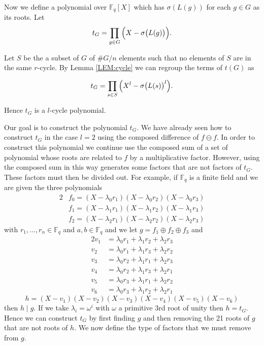 \documentclass{article}
\theoremstyle{plain}
\theoremstyle{definition}
\def\Fq {{ \mathbb{F} _ {q} }}
\begin{document}
    Now we define a polynomial over $\Fq[X]$ which has $\sigma(L(g))$ for each $g \in G$ as its roots. Let 
		\[
		    t_G = \prod_{g \in G}{\Bigl(X-\sigma \bigl(L(g) \bigr) \Bigr)}.
		\]
		
		Let $S$ be the a subset of $G$ of $ \#G/n$ elements such that no elements of $S$ are in the same $r$-cycle. By Lemma \ref{LEM:cycle} we can regroup the terms of $t(G)$ as

    \begin{equation}
		\label{EQ:tG}
        t_G=\prod_{s \in S}{\Bigl(X^l-\sigma \bigl(L(s) \bigr)^l \Bigr)}.
    \end{equation}

    Hence $t_G$ is a $l$-cycle polynomial.
		
	  Our goal is to construct the polynomial $t_G$. We have already seen how to construct $t_G$ in the case $l=2$ using the composed difference of $f \ominus f$. In order to construct this polynomial we continue use the composed sum of a set of polynomial whose roots are related to $f$ by a multiplicative factor. However, using the composed sum in this way generates some factors that are not factors of $t_G$. These factors must then be divided out. For example, if $\Fq$ is a finite field and we are given the three polynomials 
		\begin{alignat*}{2}
		    &f_0=(X-\lambda_0 r_1)(X-\lambda_0 r_2)(X-\lambda_0 r_3) \\
				&f_1=(X-\lambda_1 r_1)(X-\lambda_1 r_2)(X-\lambda_1 r_3) \\
				&f_2=(X-\lambda_2 r_1)(X-\lambda_2 r_2)(X-\lambda_2 r_3) 
		\end{alignat*}
		\noindent with $r_1,\ldots,r_n \in \Fq$ and $a,b \in \Fq$ and we let $g=f_1 \oplus f_2 \oplus f_3$ and 
		\begin{alignat*}{2}
		    v_1 &= \lambda_0 r_1+\lambda_1 r_2+\lambda_2 r_3 \\
				v_2 &= \lambda_0 r_1+\lambda_1 r_3+\lambda_2 r_2 \\
				v_3 &= \lambda_0 r_2+\lambda_1 r_1+\lambda_2 r_3 \\
				v_4 &= \lambda_0 r_2+\lambda_1 r_3+\lambda_2 r_1 \\
				v_5 &= \lambda_0 r_3+\lambda_1 r_1+\lambda_2 r_2 \\
				v_6 &= \lambda_0 r_3+\lambda_1 r_2+\lambda_2 r_1 
		\end{alignat*}
		\[ h=(X-v_1)(X-v_2)(X-v_3)(X-v_4)(X-v_5)(X-v_6) \]
		\noindent then $h \mid g$. If we take $\lambda_i=\omega^i$ with $\omega$ a primitive 3rd root of unity then $h=t_G$. Hence we can construct $t_G$ by first finding $g$ and then removing the 21 roots of $g$ that are not roots of $h$. We now define the type of factors that we must remove from $g$. 
		
\end{document}
